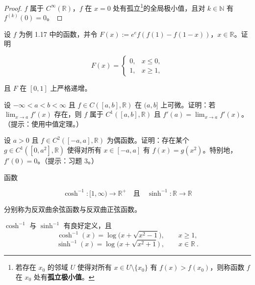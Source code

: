 \begin{proof}

$f$ 属于 $C^\infty(\mathbb{R})$，$f$ 在 $x=0$ 处有孤立\footnote{若存在 $ x_0 $ 的邻域 $ U $ 使得对所有 $ x \in U \setminus \{x_0\} $ 有 $ f(x) > f(x_0) $，则称函数 $ f $ 在 $ x_0 $ 处有\textbf{孤立极小值}。}的全局极小值，且对 $k\in\mathbb{N}$ 有 $f^{(k)}(0)=0$。

\end{proof}

\begin{exercises}
\item[2.]

设 $f$ 为例 1.17 中的函数，并令 $F(x) := e^e f(f(1) - f(1 - x))$，$x \in \mathbb{R}$。证明

\begin{equation*}
F(x)=\left\{\begin{array}{ll}0,&x\leq0,\\1,&x\geq1,\end{array}\right.
\end{equation*}

且 $F$ 在 $[0,1]$ 上严格递增。

\item[3.]

设 $ -\infty < a < b < \infty $ 且 $ f \in C([a, b], \mathbb{R}) $ 在 $ (a, b] $ 上可微。证明：若 $ \lim_{x \to a} f'(x) $ 存在，则 $ f $ 属于 $ C^1([a, b], \mathbb{R}) $ 且 $ f'(a) = \lim_{x \to a} f'(x) $。（提示：使用中值定理。）

\item[4.]

设 $ a > 0 $ 且 $ f \in C^2([-a, a], \mathbb{R}) $ 为偶函数。证明：存在某个 $ g \in C^1([0, a^2], \mathbb{R}) $ 使得对所有 $ x \in [-a, a] $ 有 $ f(x) = g(x^2) $。特别地，$ f'(0) = 0 $。（提示：习题 3。）

\item[5.]

函数

\[
\operatorname{c o s h}^{-1}\colon[1,\infty)\to\mathbb{R}^{+}\quad\text{且}\quad\sinh^{-1}\colon\mathbb{R}\to\mathbb{R}
\]

分别称为反双曲余弦函数与反双曲正弦函数。

\begin{items}
\item

\proofhead
$ \cosh^{-1} $ 与 $ \sinh^{-1} $ 有良好定义，且
\[
\cosh^{-1}(x)=\log\bigl(x+\sqrt{x^{2}-1}\bigr),\qquad x\geq1,
\]
\[
\sinh^{-1}(x)=\log\bigl(x+\sqrt{x^{2}+1}\bigr)~,\qquad x\in\mathbb{R}~.
\]
\item


\end{items}
\end{exercises}
